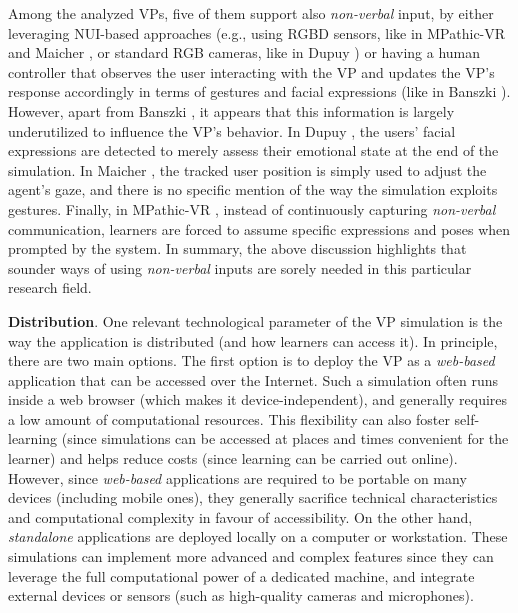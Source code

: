 Among the analyzed VPs, five of them support also \emph{non-verbal} input, by either leveraging NUI-based approaches (e.g., using RGBD sensors, like in MPathic-VR \cite{guetterman2019medical,kron2017using} and Maicher \cite{maicher2017developing}, or standard RGB cameras, like in Dupuy \cite{dupuy2019virtual}) or having a human controller that observes the user interacting with the VP and updates the VP's response accordingly in terms of gestures and facial expressions (like in Banszki \cite{banszki2018clinical,quail2016student}). 
However, apart from Banszki \cite{banszki2018clinical,quail2016student}, it appears that this information is largely underutilized to influence the VP's behavior. In Dupuy \cite{dupuy2019virtual}, the users' facial expressions are detected to merely assess their emotional state at the end of the simulation. In Maicher \cite{maicher2017developing}, the tracked user position is simply used to adjust the agent's gaze, and there is no specific mention of the way the simulation exploits gestures. Finally, in  MPathic-VR \cite{guetterman2019medical,kron2017using}, instead of continuously capturing \emph{non-verbal} communication, learners are forced to assume specific expressions and poses when prompted by the system. In summary, the above discussion highlights that sounder ways of using \emph{non-verbal} inputs are sorely needed in this particular research field.


\textbf{Distribution}. One relevant technological parameter of the VP simulation is the way the application is distributed (and how learners can access it). In principle, there are two main options. The first option is to deploy the VP as a \emph{web-based} application that can be accessed over the Internet. Such a simulation often runs inside a web browser (which makes it device-independent), and generally requires a low amount of computational resources. This flexibility can also foster self-learning (since simulations can be accessed at places and times convenient for the learner) and helps reduce costs (since learning can be carried out online). However, since \emph{web-based} applications are required to be portable on many devices (including mobile ones), they generally sacrifice technical characteristics and computational complexity in favour of accessibility. On the other hand, \emph{standalone} applications are deployed locally on a computer or workstation. These simulations can implement more advanced and complex features since they can leverage the full computational power of a dedicated machine, and integrate external devices or sensors (such as high-quality cameras and microphones).

